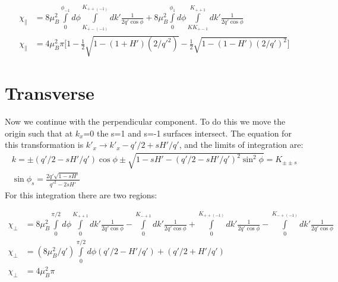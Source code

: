 \documentclass[prb,showpacs,amssymb,amsmath,twocolumn]{revtex4-1}
\begin{document}
\begin{widetext}
 
   \begin{align*}
\chi_\parallel&=8\mu_B^2\int\limits_0^{\phi_{-1}} d\phi \int\limits_{K_{+-(-1)}}^{K_{++(-1)}}dk'  \frac{ 1}{ 2q'\cos\phi}  +8\mu_B^2\int\limits_0^{\phi_1} d\phi \int\limits_{KK_{+-1}}^{K_{++1}}dk'  \frac{ 1}{ 2q'\cos\phi} \\
\chi_\parallel&=4\mu_B^2\pi\bigg[1 - \frac{1}{2}\sqrt{1-(1+H')(2/q'^2)} -\frac{1}{2}\sqrt{1-(1-H')(2/q')^2}  \bigg]
 \end{align*}
  
  \section*{Transverse}
  Now we continue with the perpendicular component. To do this we move the origin such that at $k_x$=0 the s=1 and s=-1 surfaces intersect. The equation for this transformation is $k'_x \rightarrow k'_x-q'/2+sH'/q'$, and the limits of integration are:
 \begin{align*}
k=\pm(q'/2-sH'/q')\cos\phi\pm\sqrt{1-sH'-(q'/2-sH'/q')^2\sin^2\phi} = K_{\pm\pm s} \\ 
\sin{\phi_s}=\frac{2q'\sqrt{1-sH'} }{q'^2-2sH'}
 \end{align*}
 For this integration there are two regions:
 
 \begin{align*}
 \chi_\perp&=8\mu_B^2 \int\limits_0^{\pi/2} d\phi \int\limits_0^{K_{++1}}dk'  \frac{ 1}{ 2q'\cos\phi} -\int\limits_0^{K_{-+1}} dk'  \frac{ 1}{ 2q'\cos\phi} +\int\limits_0^{K_{++(-1)}} dk'  \frac{ 1}{ 2q'\cos\phi} -\int\limits_0^{K_{-+(-1)}} dk'  \frac{ 1}{ 2q'\cos\phi} \\
  \chi_\perp&=(8\mu_B^2/q') \int\limits_0^{\pi/2} d\phi (q'/2-H'/q')+(q'/2+H'/q') \\
  \chi_\perp&=4\mu_B^2\pi\\
 \end{align*}
  

\end{widetext}
\end{document}
